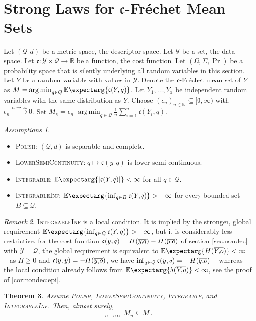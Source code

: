\documentclass{scrartcl}
\renewcommand{\subset}{\subseteq}
\newcommand{\Ex}{\E\expectarg}
\newcommand*{\mc}[1]{\mathcal{#1}}
\newcommand*{\mf}[1]{\mathfrak{#1}}
\newcommand{\N}{\mathbb{N}}
\newcommand{\R}{\mathbb{R}}
\newcommand{\equationFullstop}{\, .}
\newcommand{\eqfs}{\equationFullstop}
\DeclareMathOperator*{\argmin}{arg\,min}
\DeclareMathOperator*{\outerlim}{lim\, \overline{sup}}
\theoremstyle{plain}\newtheorem{theorem}{Theorem}[section]
\theoremstyle{definition}
\theoremstyle{remark}
\newtheorem{remark}[theorem]{Remark}
\newtheorem{assumptions}[theorem]{Assumptions}
\begin{document}
 \section{Strong Laws for $\mf c$-Fréchet Mean Sets}\label{sec:gen}
Let $(\mc Q, d)$ be a metric space, the descriptor space. Let $\mc Y$ be a set, the data space. Let $\mf c\colon \mc Y \times\mc Q \to \R$ be a function, the cost function. Let $(\Omega, \Sigma, \Pr)$ be a probability space that is silently underlying all random variables in this section. Let $Y$ be a random variable with values in $\mc Y$. Denote the $\mf c$-Fréchet mean set of $Y$ as $M = \argmin_{q\in\mc Q} \Ex{\mf c(Y, q)}$.
Let $Y_1, \dots, Y_n$ be independent random variables with the same distribution as $Y$.
Choose $(\epsilon_n)_{n\in\N}\subset [0,\infty)$ with $\epsilon_n \xrightarrow{n\to\infty}0$. Set $M_n = \epsilon_n\text{-}\argmin_{q\in\mc Q} \frac1n \sum_{i=1}^n \mf c(Y_i, q)$.
\begin{assumptions}\mbox{ }
\begin{itemize}
\item 
	\textsc{Polish}: 
	$(\mc Q, d)$ is separable and complete.
\item 
	\textsc{LowerSemiContinuity}: 
	$q \mapsto \mf c(y, q)$ is lower semi-continuous.
\item 
	\textsc{Integrable}: 
	$\Ex{\abs{\mf c(Y, q)}} < \infty$ for all $q\in\mc Q$.
\item
	\textsc{IntegrableInf}:
	$\Ex{\inf_{q \in B}\mf c(Y, q)} > - \infty$ for every bounded set $B \subset \mc Q$.
\end{itemize}
\end{assumptions}
\begin{remark}\label{rem:integrableinf}
	\textsc{IntegrableInf} is a local condition. It is implied by the stronger, global requirement $\Ex{\inf_{q \in \mc Q}\mf c(Y, q)} > - \infty$, but it is considerably less restrictive: for the cost function $\mf c(y,q) = H(\ol yq) - H(\ol yo)$ of section \ref{sec:nondec} with $\mc Y = \mc Q$, the global requirement is equivalent to $\Ex{H(\ol Yo)} < \infty$ -- as $H\geq0$ and $\mf c(y,y) = -H(\ol yo)$, we have $\inf_{q\in\mc Q}\mf c(y, q) = -H(\ol yo)$ -- whereas the local condition already follows from $\Ex{h(\ol Yo)} < \infty$, see the proof of \autoref{cor:nondec:epi}.
\end{remark}
\begin{theorem}\label{thm:epi}
	Assume \textsc{Polish}, \textsc{LowerSemiContinuity}, \textsc{Integrable}, and \textsc{IntegrableInf}.
	Then, almost surely,
	\begin{equation*}
		\outerlim_{n\to\infty}\, M_n \subset M
		\eqfs
	\end{equation*}
\end{theorem}
\end{document}
